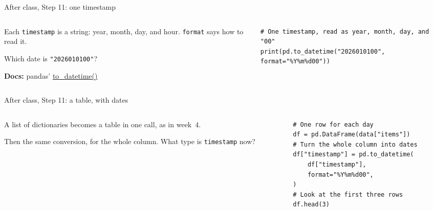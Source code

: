 \documentclass[9pt,aspectratio=169]{beamer}
\begin{document}
\begin{frame}[fragile]{After class, Step 11: one timestamp}
    \begin{columns}[T]
        \begin{column}{0.37\textwidth}
            Each \texttt{timestamp} is a string: year, month, day, and hour. \texttt{format} says how to read it.

            \medskip
            Which date is \texttt{"2026010100"}?

            \medskip
            {\scriptsize\textbf{Docs:} pandas' \href{https://pandas.pydata.org/docs/reference/api/pandas.to_datetime.html}{to\_datetime()}\par}
        \end{column}
        \begin{column}{0.6\textwidth}
\begin{lstlisting}[style=lab]
# One timestamp, read as year, month, day, and "00"
print(pd.to_datetime("2026010100", format="%Y%m%d00"))
\end{lstlisting}
        \end{column}
    \end{columns}
\end{frame}

\begin{frame}[fragile]{After class, Step 11: a table, with dates}
    \begin{columns}[T]
        \begin{column}{0.37\textwidth}
            A list of dictionaries becomes a table in one call, as in week~4.

            \medskip
            Then the same conversion, for the whole column. What type is \texttt{timestamp} now?
        \end{column}
        \begin{column}{0.6\textwidth}
\begin{lstlisting}[style=lab]
# One row for each day
df = pd.DataFrame(data["items"])
# Turn the whole column into dates
df["timestamp"] = pd.to_datetime(
    df["timestamp"],
    format="%Y%m%d00",
)
# Look at the first three rows
df.head(3)
\end{lstlisting}
        \end{column}
    \end{columns}
\end{frame}
\end{document}
